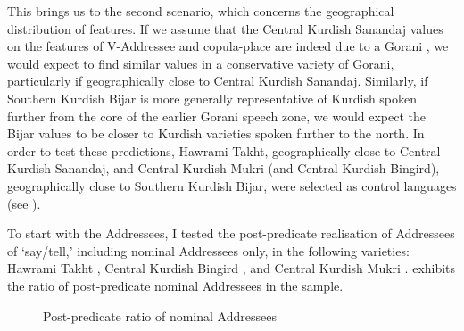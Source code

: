 \documentclass[output=paper,colorlinks,citecolor=brown]{langscibook}
\begin{document}
\begin{sloppypar}
This brings us to the second scenario, which concerns the geographical distribution of features. If we assume that the Central Kurdish Sanandaj values on the features of V-Addressee and copula-place are indeed due to a Gorani , we would expect to find similar values in a conservative variety of Gorani, particularly if geographically close to Central Kurdish Sanandaj. Similarly, if Southern Kurdish Bijar is more generally representative of Kurdish spoken further from the core of the earlier Gorani speech zone, we would expect the Bijar values to be closer to Kurdish varieties spoken further to the north. In order to test these predictions, Hawrami Takht, geographically close to Central Kurdish Sanandaj, and Central Kurdish Mukri (and Central Kurdish Bingird), geographically close to Southern Kurdish Bijar, were selected as control languages (see ).

To start with the Addressees, I tested the post-predicate realisation of Addressees of `say/tell,' including nominal Addressees only, in the following varieties: Hawrami Takht \citep[20 clauses,][]{mohammadirad_takht_nodate}{}{}, Central Kurdish Bingird \citep[14 clauses,][136–170]{mackenzie_kurdish_1962}{}{}, and Central Kurdish Mukri \citep[12 clauses,][]{Opengin2016}{}{}.  exhibits the ratio of post-predicate nominal Addressees in the sample.

\begin{figure}
    \caption{Post-predicate ratio of nominal Addressees}
    \label{Kurdish:fig:3}
\end{figure}


\end{sloppypar}
\end{document}
